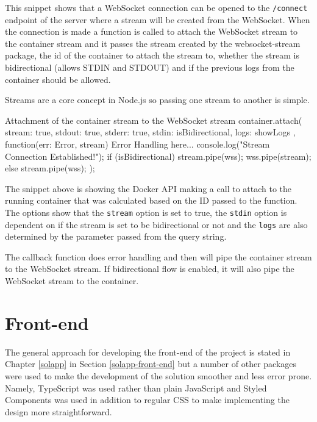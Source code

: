 This snippet shows that a WebSocket connection can be opened to the \texttt{/connect} endpoint of the server where a stream will be created from the WebSocket. When the connection is made a function is called to attach the WebSocket stream to the container stream and it passes the stream created by the websocket-stream package, the id of the container to attach the stream to, whether the stream is bidirectional (allows STDIN and STDOUT) and if the previous logs from the container should be allowed.

Streams are a core concept in Node.js so passing one stream to another is simple.

\begin{sexylisting}{Attachment of the container stream to the WebSocket stream}
container.attach(
    {
        stream: true,
        stdout: true,
        stderr: true,
        stdin: isBidirectional,
        logs: showLogs
    },
    function(err: Error, stream) {
        {Error Handling here...}
        console.log("Stream Connection Established!");
        if (isBidirectional) {
            stream.pipe(wss);
            wss.pipe(stream);
        } else {
            stream.pipe(wss);
        }
    }
);
\end{sexylisting}

The snippet above is showing the Docker API making a call to attach to the running container that was calculated based on the ID passed to the function. The options show that the \texttt{stream} option is set to true, the \texttt{stdin} option is dependent on if the stream is set to be bidirectional or not and the \texttt{logs} are also determined by the parameter passed from the query string.

The callback function does error handling and then will pipe the container stream to the WebSocket stream. If bidirectional flow is enabled, it will also pipe the WebSocket stream to the container. 


\section{Front-end}

The general approach for developing the front-end of the project is stated in Chapter \ref{solapp} in Section \ref{solapp-front-end} but a number of other packages were used to make the development of the solution smoother and less error prone. Namely, TypeScript \cite{typescript} was used rather than plain JavaScript and Styled Components \cite{styledcomp} was used in addition to regular CSS to make implementing the design more straightforward.


